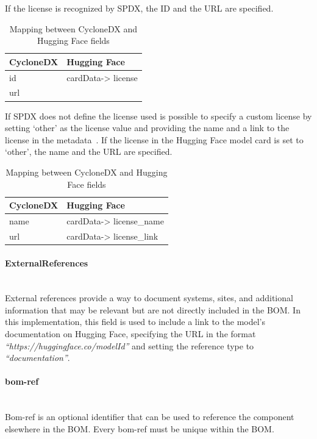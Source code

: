 \documentclass[12pt,a4paper, oneside, openright]{book}
\begin{document}
If the license is recognized by SPDX, the ID and the URL are specified.

\begin{table}[h!]
    \centering
    \begin{tabular}{|p{7cm}|p{6cm}|}
        \hline
        \textbf{CycloneDX} & \textbf{Hugging Face}\\ \hline
        id  & cardData-> license\\ \hline
        url  &  \\ \hline
    \end{tabular}
    \caption{Mapping between CycloneDX and Hugging Face fields}
    \label{tab:cyclonedx_huggingface}
\end{table}

If SPDX does not define the license used is possible to specify a custom license by setting `other' as the license value and providing the name and a link to the license in the metadata~\cite{hf_model_cards_license}.
If the license in the Hugging Face model card is set to `other', the name and the URL are specified.
\begin{table}[h!]
    \centering
    \begin{tabular}{|p{7cm}|p{6cm}|}
        \hline
        \textbf{CycloneDX} & \textbf{Hugging Face} \\ \hline
        name  & cardData-> license\_name\\ \hline
        url  & cardData-> license\_link  \\ \hline
    \end{tabular}
    \caption{Mapping between CycloneDX and Hugging Face fields}
    \label{tab:cyclonedx_huggingface}
\end{table}


\paragraph{ExternalReferences} \mbox{} \\
External references provide a way to document systems, sites, and additional information that may be relevant but are not directly included in the BOM. In this implementation, this field is used to include a link to the model's documentation on Hugging Face, specifying the URL in the format \textit{``https://huggingface.co/modelId''} and setting the reference type to \textit{``documentation''}.


\paragraph{bom-ref} \mbox{} \\
Bom-ref is an optional identifier that can be used to reference the component elsewhere in the BOM. Every bom-ref must be unique within the BOM.
\end{document}
